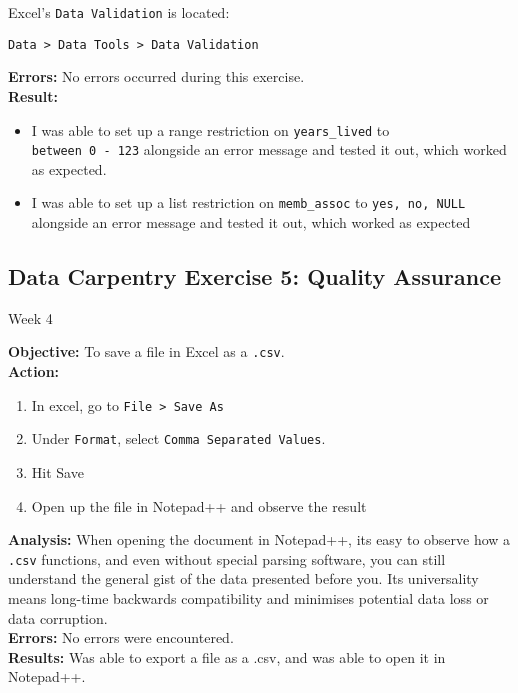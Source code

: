 \documentclass{article}
\begin{document}
Excel's \verb|Data Validation| is located: \begin{center}
\verb|Data > Data Tools > Data Validation|
\end{center}
\textbf{Errors:}
No errors occurred during this exercise.\\
\textbf{Result:}
\begin{itemize}
    \item I was able to set up a range restriction on \verb|years_lived| to \\\verb|between 0 - 123| alongside an error message and tested it out, which worked as expected.
    \item I was able to set up a list restriction on \verb|memb_assoc| to \verb|yes, no, NULL| alongside an error message and tested it out, which worked as expected
\end{itemize}
\newpage
\begin{center}
\section*{Data Carpentry Exercise 5: Quality Assurance}
Week 4
\end{center}
\textbf{Objective:} To save a file in Excel as a \verb|.csv|.\\
\textbf{Action:}
\begin{enumerate}
    \item In excel, go to \verb|File > Save As|
    \item Under \verb|Format|, select \verb|Comma Separated Values|.
    \item Hit Save
    \item Open up the file in Notepad++ and observe the result
\end{enumerate}
\textbf{Analysis:} When opening the document in Notepad++, its easy to observe how a \verb|.csv| functions, and even without special parsing software, you can still understand the general gist of the data presented before you. Its universality means long-time backwards compatibility and minimises potential data loss or data corruption.\\
\textbf{Errors:} No errors were encountered.\\
\textbf{Results:} Was able to export a file as a .csv, and was able to open it in Notepad++.
\end{document}
